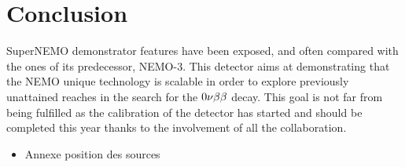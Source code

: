 \section{Conclusion}

SuperNEMO demonstrator features have been exposed, and often compared with the ones of its predecessor, NEMO-$3$.
This detector aims at demonstrating that the NEMO unique technology is scalable in order to explore previously unattained reaches in the search for the $0\nu\beta\beta$ decay.
This goal is not far from being fulfilled as the calibration of the detector has started and should be completed this year thanks to the involvement of all the collaboration.

\begin{itemize}
\item Annexe position des sources
\end{itemize}
